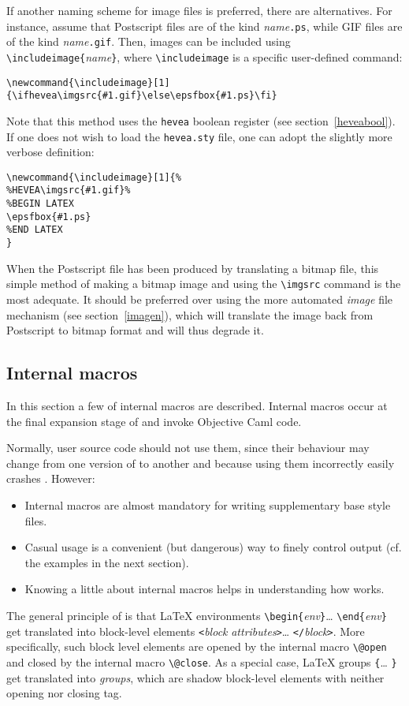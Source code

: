 If another naming scheme for image files is preferred, there are
alternatives.
For instance, assume that Postscript files are of the kind
\textit{name}\texttt{.ps}, while GIF files are of the kind
\textit{name}\texttt{.gif}.
Then, images can be included using
\verb+\includeimage{+\textit{name}\verb+}+, where
\verb+\includeimage+ is a specific user-defined command:
\begin{verbatim}
\newcommand{\includeimage}[1]{\ifhevea\imgsrc{#1.gif}\else\epsfbox{#1.ps}\fi}
\end{verbatim}
Note that this method uses the \texttt{hevea} boolean register (see
section~\ref{heveabool}).
If one does not wish to load the \texttt{hevea.sty} file,
one can adopt the slightly more verbose definition:
\begin{verbatim}
\newcommand{\includeimage}[1]{%
%HEVEA\imgsrc{#1.gif}%
%BEGIN LATEX
\epsfbox{#1.ps}
%END LATEX
}
\end{verbatim}
When the Postscript file has been produced by
translating a bitmap file, this simple method of making a bitmap image and
using the \verb+\imgsrc+ command 
is the most adequate.
It should be preferred over using the more automated \textit{image} file
mechanism (see section~\ref{imagen}),
which will translate the image back from
Postscript to bitmap format and will thus degrade it.




\subsection{Internal \label{internal}macros}
In this section a few of \hevea{} internal macros are
described.
Internal macros occur at the final expansion stage of \hevea{} and
invoke Objective Caml code.

Normally, user source code should not use them, since
their behaviour may change from one version of \hevea{} to another and
because using them incorrectly easily
crashes \hevea.
However:
\begin{itemize}
\item Internal macros
are almost mandatory for writing supplementary base style files.
\item Casual usage is a convenient (but dangerous) way to finely control
output (cf. the examples in the next section).
\item Knowing a little about internal macros helps in understanding how
\hevea{} works.
\end{itemize}


The general principle of \hevea{} is that \LaTeX{} environments
\verb+\begin{+\textit{env}\verb+}+\ldots{}
\verb+\end{+\textit{env}\verb+}+ get
translated into \html{} block-level elements \verb+<+\textit{block}
\textit{attributes}\verb+>+\ldots{} \verb+</+\textit{block}\verb+>+.
More specifically, such block level elements are opened by the
internal macro \verb+\@open+ and closed by the internal macro
\verb+\@close+.
As a special case, \LaTeX{} groups \verb+{+\ldots{} \verb+}+
get translated into \html{} \emph{groups}, which are shadow block-level
elements with neither opening nor closing tag.

